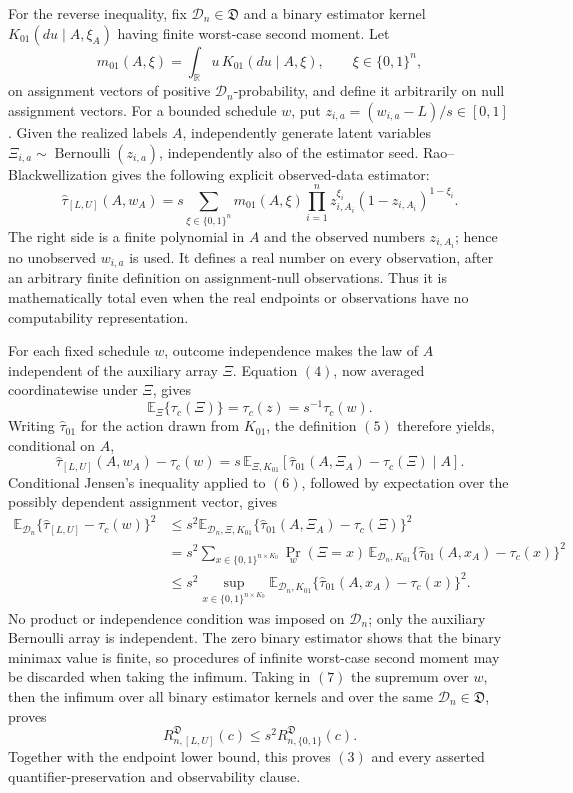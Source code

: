 For the reverse inequality, fix \(\mathcal D_n\in\mathfrak D\) and a binary estimator kernel \(K_{01}(du\mid A,\xi_A)\) having finite worst-case second moment.  Let
\[
 m_{01}(A,\xi)=\int_{\mathbb R}u\,
 K_{01}(du\mid A,\xi),
 \qquad \xi\in\{0,1\}^n,
\]
on assignment vectors of positive \(\mathcal D_n\)-probability, and define it arbitrarily on null assignment vectors.  For a bounded schedule \(w\), put \(z_{i,a}=(w_{i,a}-L)/s\in[0,1]\).  Given the realized labels \(A\), independently generate latent variables \(\Xi_{i,a}\sim\operatorname{Bernoulli}(z_{i,a})\), independently also of the estimator seed.  Rao--Blackwellization gives the following explicit observed-data estimator:
\[
 \widehat\tau_{[L,U]}(A,w_A)
 =s\sum_{\xi\in\{0,1\}^n}m_{01}(A,\xi)
   \prod_{i=1}^n
   z_{i,A_i}^{\xi_i}(1-z_{i,A_i})^{1-\xi_i}.
\tag{5}
\]
The right side is a finite polynomial in \(A\) and the observed numbers \(z_{i,A_i}\); hence no unobserved \(w_{i,a}\) is used.  It defines a real number on every observation, after an arbitrary finite definition on assignment-null observations.  Thus it is mathematically total even when the real endpoints or observations have no computability representation.

For each fixed schedule \(w\), outcome independence makes the law of \(A\) independent of the auxiliary array \(\Xi\).  Equation \((4)\), now averaged coordinatewise under \(\Xi\), gives
\[
 \mathbb E_{\Xi}\{\tau_c(\Xi)\}
 =\tau_c(z)=s^{-1}\tau_c(w).
\]
Writing \(\widehat\tau_{01}\) for the action drawn from \(K_{01}\), the definition \((5)\) therefore yields, conditional on \(A\),
\[
 \widehat\tau_{[L,U]}(A,w_A)-\tau_c(w)
 =s\,\mathbb E_{\Xi,K_{01}}\!\left[
 \widehat\tau_{01}(A,\Xi_A)-\tau_c(\Xi)\mid A\right].
\tag{6}
\]
Conditional Jensen's inequality applied to \((6)\), followed by expectation over the possibly dependent assignment vector, gives
\[
\begin{aligned}
 \mathbb E_{\mathcal D_n}
 \{\widehat\tau_{[L,U]}-\tau_c(w)\}^2
 &\le s^2\mathbb E_{\mathcal D_n,\Xi,K_{01}}
 \{\widehat\tau_{01}(A,\Xi_A)-\tau_c(\Xi)\}^2\\
 &=s^2\sum_{x\in\{0,1\}^{n\times K_0}}
 \Pr_w(\Xi=x)\,
 \mathbb E_{\mathcal D_n,K_{01}}
 \{\widehat\tau_{01}(A,x_A)-\tau_c(x)\}^2\\
 &\le s^2\sup_{x\in\{0,1\}^{n\times K_0}}
 \mathbb E_{\mathcal D_n,K_{01}}
 \{\widehat\tau_{01}(A,x_A)-\tau_c(x)\}^2.
\end{aligned}
\tag{7}
\]
No product or independence condition was imposed on \(\mathcal D_n\); only the auxiliary Bernoulli array is independent.  The zero binary estimator shows that the binary minimax value is finite, so procedures of infinite worst-case second moment may be discarded when taking the infimum.  Taking in \((7)\) the supremum over \(w\), then the infimum over all binary estimator kernels and over the same \(\mathcal D_n\in\mathfrak D\), proves
\[
 R^{\mathfrak D}_{n,[L,U]}(c)
 \le s^2R^{\mathfrak D}_{n,\{0,1\}}(c).
\]
Together with the endpoint lower bound, this proves \((3)\) and every asserted quantifier-preservation and observability clause.

